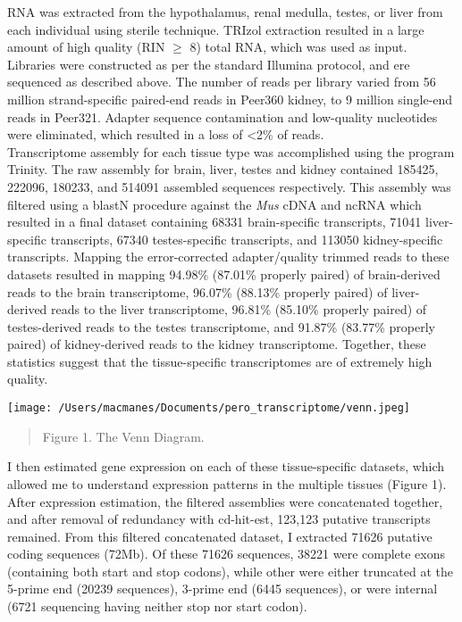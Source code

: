 \documentclass[11pt]{article}
\begin{document}
RNA was extracted from the hypothalamus, renal medulla, testes, or liver from each individual using sterile technique. TRIzol extraction resulted in a large amount of high quality (RIN $\geq$ 8) total RNA, which was used as input. Libraries were constructed as per the standard Illumina protocol, and ere sequenced as described above. The number of reads per library varied from 56 million strand-specific paired-end reads in Peer360 kidney, to 9 million single-end reads in Peer321. Adapter sequence contamination and low-quality nucleotides were eliminated, which resulted in a loss of \textless 2\% of reads. \\

Transcriptome assembly for each tissue type was accomplished using the program Trinity. The raw assembly for brain, liver, testes and kidney contained 185425, 222096, 180233, and 514091 assembled sequences respectively. This assembly was filtered using a blastN procedure against the \textit{Mus} cDNA and ncRNA which resulted in a final dataset containing 68331 brain-specific transcripts, 71041 liver-specific transcripts, 67340 testes-specific transcripts, and 113050 kidney-specific transcripts. Mapping the error-corrected adapter/quality trimmed reads to these datasets resulted in mapping 94.98\% (87.01\% properly paired) of brain-derived reads to the brain transcriptome, 96.07\% (88.13\% properly paired) of liver-derived reads to the liver transcriptome, 96.81\% (85.10\% properly paired) of testes-derived reads to the testes transcriptome, and 91.87\% (83.77\% properly paired) of kidney-derived reads to the kidney transcriptome. Together, these statistics suggest that the tissue-specific transcriptomes are of extremely high quality.  \\

\centerline{\texttt{[image: /Users/macmanes/Documents/pero\_transcriptome/venn.jpeg]}}
\begin{quote}
\small{Figure 1. The Venn Diagram.}
\end{quote}   

I then estimated gene expression on each of these tissue-specific datasets, which allowed me to understand expression patterns in the multiple tissues ({\hypertarget{Figure 1}{Figure 1}}). After expression estimation, the filtered assemblies were concatenated together, and after removal of redundancy with cd-hit-est, 123,123 putative transcripts remained. From this filtered concatenated dataset, I extracted 71626 putative coding sequences (72Mb). Of these 71626 sequences, 38221 were complete exons (containing both start and stop codons), while other were either truncated at the 5-prime end (20239 sequences), 3-prime end (6445 sequences), or were internal (6721 sequencing having neither stop nor start codon). 
\end{document}
